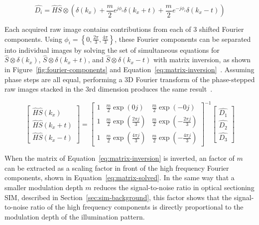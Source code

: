 \begin{equation} \label{eq:heintzmann-fourier}
\hat{D_i} = \hat{H} \hat{S} \otimes \left( \delta \left( k_x \right) + \frac{m}{2} e^{j\phi_i} \delta \left( k_x + t \right) + \frac{m}{2} e^{-j\phi_i} \delta \left( k_x - t \right) \right)
\end{equation}

Each acquired raw image contains contributions from each of 3 shifted Fourier components.
Using $\phi_i = \left\lbrace0, \frac{2\pi}{3}, \frac{4\pi}{3}\right\rbrace$, these Fourier components can be separated into individual images by solving the set of simultaneous equations for $\hat{S}\otimes\delta \left( k_x \right)$, $\hat{S}\otimes\delta \left( k_x + t \right)$, and $\hat{S}\otimes\delta \left( k_x - t \right)$ with matrix inversion, as shown in Figure~\ref{fig:fourier-components} and Equation~\ref{eq:matrix-inversion}~\cite{wicker2013phase}.
Assuming phase steps are all equal, performing a 3D Fourier transform of the phase-stepped raw images stacked in the 3rd dimension produces the same result~\cite{gustafsson2005nonlinear}.

\begin{equation} \label{eq:matrix-inversion}
\begin{bmatrix} \hat{H}\hat{S}\left(k_x\right) \\ \hat{H}\hat{S}\left(k_x+t\right) \\ \hat{H}\hat{S}\left(k_x-t\right) \end{bmatrix} =
\begin{bmatrix}
1 & \frac{m}{2}\exp\left(0j\right) & \frac{m}{2}\exp\left(-0j\right) \\
1 & \frac{m}{2}\exp\left(\frac{2\pi j}{3}\right) & \frac{m}{2}\exp\left(-\frac{2\pi j}{3}\right) \\
1 & \frac{m}{2}\exp\left(\frac{4\pi j}{3}\right) & \frac{m}{2}\exp\left(-\frac{4\pi j}{3}\right)
\end{bmatrix}^{-1}
\begin{bmatrix} \hat{D_1} \\ \hat{D_2} \\ \hat{D_3} \end{bmatrix}
\end{equation}

When the matrix of Equation~\ref{eq:matrix-inversion} is inverted, an factor of $m$ can be extracted as a scaling factor in front of the high frequency Fourier components, shown in Equation~\ref{eq:matrix-solved}.
In the same way that a smaller modulation depth $m$ reduces the signal-to-noise ratio in optical sectioning SIM, described in Section~\ref{sec:sim-background}, this factor shows that the signal-to-noise ratio of the high frequency components is directly proportional to the modulation depth of the illumination pattern.

